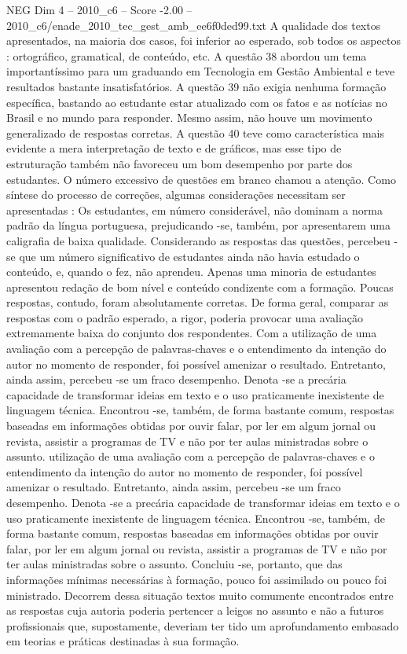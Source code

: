 \begin{textsample}{NEG Dim 4 – 2010\_c6 – Score -2.00 – 2010\_c6/enade\_2010\_tec\_gest\_amb\_ee6f0ded99.txt}
A qualidade dos textos apresentados, na maioria dos casos, foi inferior ao esperado, sob todos os aspectos : ortográfico, gramatical, de conteúdo, etc.
A questão 38 abordou um tema importantíssimo para um graduando em Tecnologia em Gestão Ambiental e teve resultados bastante insatisfatórios.
A questão 39 não exigia nenhuma formação específica, bastando ao estudante estar atualizado com os fatos e as notícias no Brasil e no mundo para responder.
Mesmo assim, não houve um movimento generalizado de respostas corretas.
A questão 40 teve como característica mais evidente a mera interpretação de texto e de gráficos, mas esse tipo de estruturação também não favoreceu um bom desempenho por parte dos estudantes.
O número excessivo de questões em branco chamou a atenção.
Como síntese do processo de correções, algumas considerações necessitam ser apresentadas : Os estudantes, em número considerável, não dominam a norma padrão da língua portuguesa, prejudicando -se, também, por apresentarem uma caligrafia de baixa qualidade.
Considerando as respostas das questões, percebeu -se que um número significativo de estudantes ainda não havia estudado o conteúdo, e, quando o fez, não aprendeu.
Apenas uma minoria de estudantes apresentou redação de bom nível e conteúdo condizente com a formação.
Poucas respostas, contudo, foram absolutamente corretas.
De forma geral, comparar as respostas com o padrão esperado, a rigor, poderia provocar uma avaliação extremamente baixa do conjunto dos respondentes.
Com a utilização de uma avaliação com a percepção de palavras-chaves e o entendimento da intenção do autor no momento de responder, foi possível amenizar o resultado.
Entretanto, ainda assim, percebeu -se um fraco desempenho.
Denota -se a precária capacidade de transformar ideias em texto e o uso praticamente inexistente de linguagem técnica.
Encontrou -se, também, de forma bastante comum, respostas baseadas em informações obtidas por ouvir falar, por ler em algum jornal ou revista, assistir a programas de TV e não por ter aulas ministradas sobre o assunto. utilização de uma avaliação com a percepção de palavras-chaves e o entendimento da intenção do autor no momento de responder, foi possível amenizar o resultado.
Entretanto, ainda assim, percebeu -se um fraco desempenho.
Denota -se a precária capacidade de transformar ideias em texto e o uso praticamente inexistente de linguagem técnica.
Encontrou -se, também, de forma bastante comum, respostas baseadas em informações obtidas por ouvir falar, por ler em algum jornal ou revista, assistir a programas de TV e não por ter aulas ministradas sobre o assunto.
Concluiu -se, portanto, que das informações mínimas necessárias à formação, pouco foi assimilado ou pouco foi ministrado.
Decorrem dessa situação textos muito comumente encontrados entre as respostas cuja autoria poderia pertencer a leigos no assunto e não a futuros profissionais que, supostamente, deveriam ter tido um aprofundamento embasado em teorias e práticas destinadas à sua formação.

\end{textsample}

